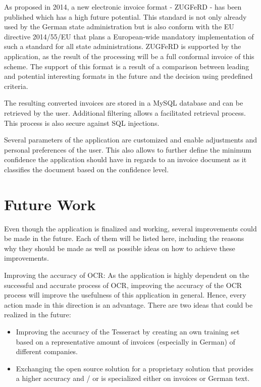 As proposed in 2014, a new electronic invoice format - ZUGFeRD - has been published which has a high future potential\cite{Ferd14}. This standard is not only already used by the German state administration but is also conform with the EU directive 2014/55/EU that plans a European-wide mandatory implementation of such a standard for all state administrations. 
ZUGFeRD is supported by the application, as the result of the processing will be a full conformal invoice of this scheme. The support of this format is a result of a comparison between leading and potential interesting formats in the future and the decision using predefined criteria.

The resulting converted invoices are stored in a MySQL database and can be retrieved by the user. Additional filtering allows a facilitated retrieval process. This process is also secure against SQL injections.

Several parameters of the application are customized and enable adjustments and personal preferences of the user. This also allows to further define the minimum confidence the application should have in regards to an invoice document as it classifies the document based on the confidence level. 

\section{Future Work}
\label{sec6.3}
Even though the application is finalized and working, several improvements could be made in the future.
Each of them will be listed here, including the reasons why they should be made as well as possible ideas on how to achieve these improvements.

Improving the accuracy of OCR: As the application is highly dependent on the successful and accurate process of OCR, improving the accuracy of the OCR process will improve the usefulness of this application in general. Hence, every action made in this direction is an advantage. There are two ideas that could be realized in the future: 
	\begin{itemize}
		\item Improving the accuracy of the Tesseract by creating an own training set based on a representative amount of invoices (especially in German) of different companies. 
		\item Exchanging the open source solution for a proprietary solution that provides a higher accuracy and / or is specialized either on invoices or German text.
	\end{itemize}


